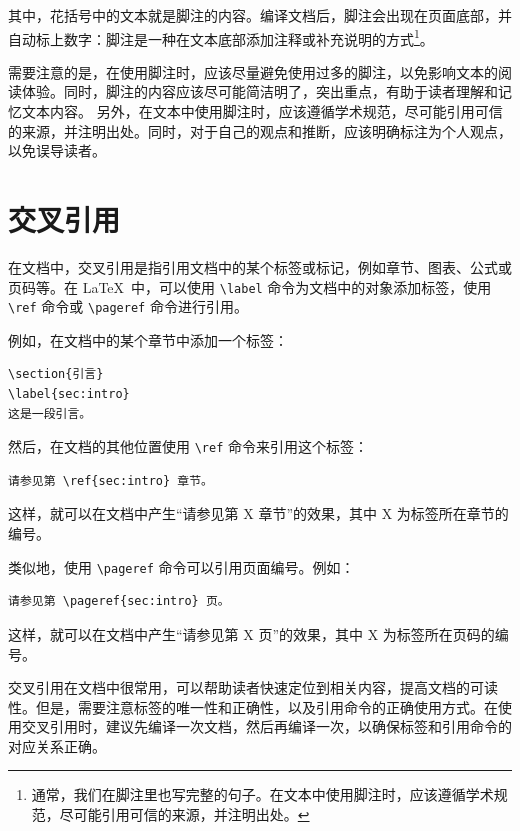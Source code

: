 其中，花括号中的文本就是脚注的内容。编译文档后，脚注会出现在页面底部，并自动标上数字：脚注是一种在文本底部添加注释或补充说明的方式\footnote{通常，我们在脚注里也写完整的句子。在文本中使用脚注时，应该遵循学术规范，尽可能引用可信的来源，并注明出处。}。

需要注意的是，在使用脚注时，应该尽量避免使用过多的脚注，以免影响文本的阅读体验。同时，脚注的内容应该尽可能简洁明了，突出重点，有助于读者理解和记忆文本内容。
另外，在文本中使用脚注时，应该遵循学术规范，尽可能引用可信的来源，并注明出处。同时，对于自己的观点和推断，应该明确标注为个人观点，以免误导读者。

\section{交叉引用}

在文档中，交叉引用是指引用文档中的某个标签或标记，例如章节、图表、公式或页码等。在 \LaTeX\ 中，可以使用 \verb|\label| 命令为文档中的对象添加标签，使用 \verb|\ref| 命令或 \verb|\pageref| 命令进行引用。

例如，在文档中的某个章节中添加一个标签：

\begin{verbatim}
\section{引言}
\label{sec:intro}
这是一段引言。
\end{verbatim}

然后，在文档的其他位置使用 \verb|\ref| 命令来引用这个标签：

\begin{verbatim}
请参见第 \ref{sec:intro} 章节。
\end{verbatim}

这样，就可以在文档中产生“请参见第 X 章节”的效果，其中 X 为标签所在章节的编号。

类似地，使用 \verb|\pageref| 命令可以引用页面编号。例如：

\begin{verbatim}
请参见第 \pageref{sec:intro} 页。
\end{verbatim}

这样，就可以在文档中产生“请参见第 X 页”的效果，其中 X 为标签所在页码的编号。

交叉引用在文档中很常用，可以帮助读者快速定位到相关内容，提高文档的可读性。但是，需要注意标签的唯一性和正确性，以及引用命令的正确使用方式。在使用交叉引用时，建议先编译一次文档，然后再编译一次，以确保标签和引用命令的对应关系正确。

